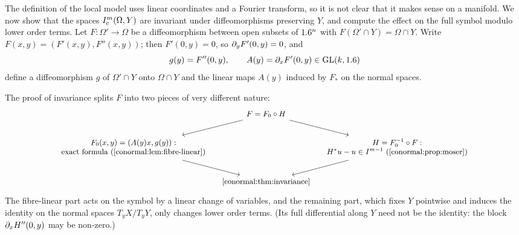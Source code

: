 The definition of the local model uses linear coordinates and a Fourier
transform, so it is not clear that it makes sense on a manifold. We now show that the spaces $I^{m}_{\mathrm c}(\Omega,Y)$ are invariant under
diffeomorphisms preserving $Y$, and compute the effect on the full symbol
modulo lower order terms.  Let $F:\Omega'\to\Omega$ be a diffeomorphism between
open subsets of $1.6^n$ with $F(\Omega'\cap Y)=\Omega\cap Y$.  Write
$F(x,y)=(F'(x,y),F''(x,y))$; then $F'(0,y)=0$, so $\partial_yF'(0,y)=0$, and
\begin{equation}\label{conormal:eq:F-data}
  g(y)=F''(0,y),\qquad A(y)=\partial_xF'(0,y)\in\operatorname{GL}(k,1.6)
\end{equation}
define a diffeomorphism $g$ of $\Omega'\cap Y$ onto $\Omega\cap Y$ and the
linear maps $A(y)$ induced by $F_*$ on the normal spaces.

The proof of invariance splits $F$ into two pieces of very different
nature:
\begin{equation*}
\begin{tikzcd}[column sep=tiny,row sep=normal,cells={nodes={font=\small}}]
  & F=F_0\circ H\arrow[dl]\arrow[dr] & \\
  \begin{array}{c}F_0(x,y)=(A(y)x,g(y)):\\ \text{exact formula
  (\cref{conormal:lem:fibre-linear})}\end{array}\arrow[dr]
  & & \begin{array}{c}H=F_0^{-1}\circ F:\\ H^*u-u\in\Ic{m-1}
  \text{ (\cref{conormal:prop:moser})}\end{array}\arrow[dl]\\
  & \text{\cref{conormal:thm:invariance}} &
\end{tikzcd}
\end{equation*}
The fibre-linear part acts on the symbol by a linear change of variables, and
the remaining part, which fixes $Y$ pointwise and induces the identity on the
normal spaces $T_yX/T_yY$, only changes lower order terms. (Its full
differential along $Y$ need not be the identity: the block $\partial_xH''(0,y)$
may be non-zero.)

